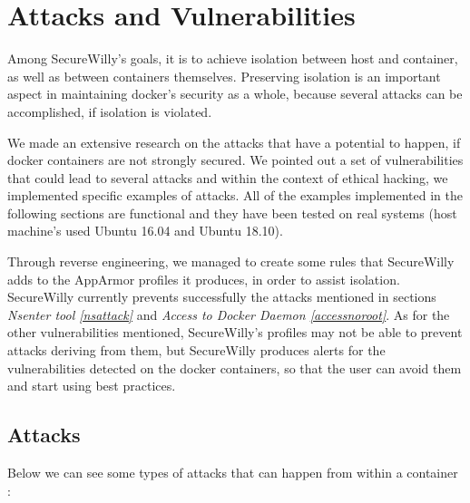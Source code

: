 \chapter{Attacks and Vulnerabilities}
Among SecureWilly's goals, it is to achieve isolation between host and container, as well as between containers themselves.
Preserving isolation is an important aspect in maintaining docker's security as a whole, because several attacks can be accomplished, if isolation is violated.

We made an extensive research on the attacks that have a potential to happen, if docker containers are not strongly secured. We pointed out a set of vulnerabilities that could lead to several attacks and within the context of ethical hacking, we implemented specific examples of attacks. All of the examples implemented in the following sections are functional and they have been tested on real systems (host machine's used Ubuntu 16.04 and Ubuntu 18.10).

Through reverse engineering, we managed to create some rules that SecureWilly adds to the AppArmor profiles it produces, in order to assist isolation. SecureWilly currently prevents successfully the attacks mentioned in sections \textit{Nsenter tool \ref{nsattack}} and \textit{Access to Docker Daemon \ref{accessnoroot}}. As for the other vulnerabilities mentioned, SecureWilly's profiles may not be able to prevent attacks deriving from them, but SecureWilly produces alerts for the vulnerabilities detected on the docker containers, so that the user can avoid them and start using best practices.

\section{Attacks}
Below we can see some types of attacks that can happen from within a container \cite{securityattacks}: 

